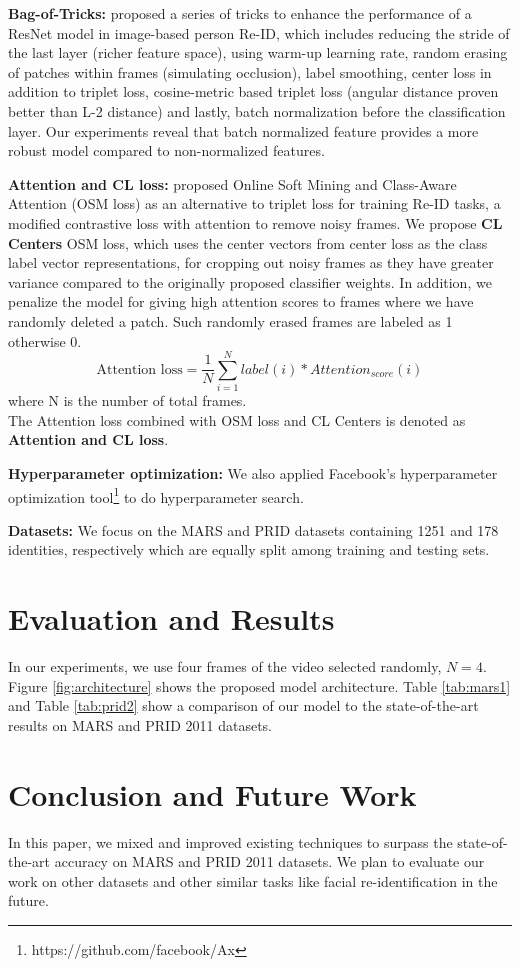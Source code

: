 \documentclass[letterpaper]{article} \usepackage{aaai20}  \usepackage{times}  \usepackage{helvet} \usepackage{courier}  \usepackage[hyphens]{url}  \usepackage{graphicx} \urlstyle{rm} \def\UrlFont{\rm}  \usepackage{graphicx}  \frenchspacing  \setlength{\pdfpagewidth}{8.5in}  \setlength{\pdfpageheight}{11in}
\begin{document}
\noindent \textbf{Bag-of-Tricks:}
\citeauthor{bagoftricks}  proposed a series of tricks to enhance the performance of a ResNet model in image-based person Re-ID, which includes reducing the stride of the last layer (richer feature space), using warm-up learning rate, random erasing of patches within frames (simulating occlusion), label smoothing, center loss in addition to triplet loss, cosine-metric based triplet loss (angular distance proven better than L-2 distance) and lastly, batch normalization before the classification layer. Our experiments reveal that batch normalized feature provides a more robust model compared to non-normalized features.

\noindent \textbf{Attention and CL loss:}
\citeauthor{osm_caa}  proposed Online Soft Mining and Class-Aware Attention (OSM loss) as an alternative to triplet loss for training Re-ID tasks, a modified contrastive loss with attention to remove noisy frames. We propose \textbf{CL Centers} OSM loss, which uses the center vectors from center loss as the class label vector representations, for cropping out noisy frames as they have greater variance compared to the originally proposed classifier weights. In addition, we penalize the model for giving high attention scores to frames where we have randomly deleted a patch. Such randomly erased frames are labeled as 1 otherwise 0.
\begin{equation}
\text{Attention loss} = \frac{1}{N} \sum^N_{i=1} label(i) * Attention_{score}(i)    
\end{equation}
where N is the number of total frames. \\ The Attention loss combined with OSM loss and CL Centers is denoted as \textbf{Attention and CL loss}.

\noindent \textbf{Hyperparameter optimization:} We also applied Facebook's hyperparameter optimization tool\footnote{https://github.com/facebook/Ax} to do hyperparameter search.

\noindent \textbf{Datasets:} We focus on the MARS and PRID datasets containing 1251 and 178 identities, respectively which are equally split among training and testing sets.

\section{Evaluation and Results}
In our experiments, we use four frames of the video selected randomly, $N=4$. Figure \ref{fig:architecture} shows the proposed model architecture. Table \ref{tab:mars1} and Table \ref{tab:prid2} show a comparison of our model to the state-of-the-art results on MARS and PRID 2011 datasets.


\section{Conclusion and Future Work}
In this paper, we mixed and improved existing techniques to surpass the state-of-the-art accuracy on MARS and PRID 2011 datasets. We plan to evaluate our work on other datasets and other similar tasks like facial re-identification in the future. 






\end{document}
